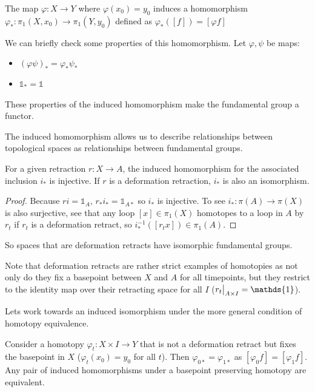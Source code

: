 \documentclass[10pt]{article}
\newcommand\restr[2]{{%
  \left.\kern-\nulldelimiterspace %
  #1 %
  \vphantom{\big|} %
  \right|_{#2} %
}}
\begin{document}
\begin{definition}
	The map $\varphi: X \to Y$ where $\varphi(x_0) = y_0$ induces a homomorphism $\varphi_*: \pi_1(X, x_0) \to \pi_1(Y, y_0)$ defined as $\varphi_*([f]) = [\varphi f]$
\end{definition}

We can briefly check some properties of this homomorphism. Let $\varphi, \psi$ be maps:
\begin{itemize}
	\item{$(\varphi\psi)_* = \varphi_*\psi_*$}
	\item{$\mathds{1}_* = \mathds{1}$}
\end{itemize}
These properties of the induced homomorphism make the fundamental group a functor.

The induced homomorphism allows us to describe relationships between topological spaces as relationships between fundamental groups.

\begin{proposition}[]
	For a given retraction $r: X \to A$, the induced homomorphism for the associated inclusion $i_*$ is injective. If $r$ is a deformation retraction, $i_*$ is also an isomorphism.
\end{proposition}

\begin{proof}
	Because $ri = \mathds{1}_A$, $r_*i_* = \mathds{1}_{A*}$ so $i_*$ is
	injective. To see $i_*: \pi(A) \to \pi(X)$ is also surjective, see that any
	loop $[x] \in \pi_1(X)$ homotopes to a loop in $A$ by $r_t$ if $r_t$ is a deformation
	retract, so $i_*^{-1}([r_tx]) \in \pi_1(A)$.
\end{proof}

So spaces that are deformation retracts have isomorphic fundamental groups.

Note that deformation retracts are rather strict examples of homotopies as not
only do they fix a basepoint between $X$ and $A$ for all timepoints, but they
restrict to the identity map over their retracting space for all $I$
($\restr{r_t}{A\times I} = \mathds{1}$). 

Lets work towards an induced isomorphism under the more general condition of
homotopy equivalence.

Consider a homotopy $\varphi_t: X \times I \to Y$ that is not a deformation retract but fixes the basepoint in $X$ ($\varphi_t(x_0) = y_0$ for all $t$). Then $\varphi_{0*} = \varphi_{1*}$ as $[\varphi_0f] = [\varphi_1f]$. Any pair of induced homomorphisms under a basepoint preserving homotopy are equivalent.
\end{document}
